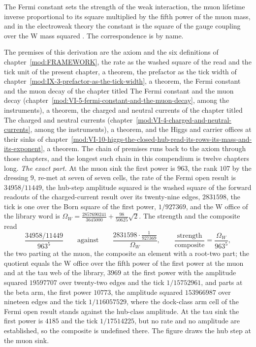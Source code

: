 \begin{chbridge}
The Fermi constant sets the strength of the weak interaction, the muon lifetime inverse proportional to its square multiplied by the fifth power of the muon mass, and in the electroweak theory the constant is the square of the gauge coupling over the W mass squared \cite{Fermi1934,Weinberg1967}. The correspondence is by name.
\end{chbridge}
\begin{chproof}
The premises of this derivation are the axiom and the six definitions of chapter~\ref{mod:FRAMEWORK}, the rate as the washed square of the read and the tick unit of the present chapter, a theorem, the prefactor as the tick width of chapter~\ref{mod:IX-3-prefactor-as-the-tick-width}, a theorem, the Fermi constant and the muon decay of the chapter titled The Fermi constant and the muon decay (chapter~\ref{mod:VI-5-fermi-constant-and-the-muon-decay}, among the instruments), a theorem, the charged and neutral currents of the chapter titled The charged and neutral currents (chapter~\ref{mod:VI-4-charged-and-neutral-currents}, among the instruments), a theorem, and the Higgs and carrier offices at their sinks of chapter~\ref{mod:VI-10-higgs-the-closed-hub-read-its-rows-its-mass-and-its-exponent}, a theorem. The chain of premises runs back to the axiom through those chapters, and the longest such chain in this compendium is twelve chapters long.
\textit{The exact part.} At the muon sink the first power is $963$, the rank $107$ by the dressing $9$, re-met at seven of seven cells, the rate of the Fermi open result is $34958/11449$, the hub-step amplitude squared is the washed square of the forward readouts of the charged-current result over its twenty-nine edges, $2831598$, the tick is one over the Born square of the first power, $1/927369$, and the W office of the library word is $\Omega_{W} = \tfrac{2857690241}{3645000} + \tfrac{98}{50625}\sqrt{2}$. The strength and the composite read
\begin{equation} \frac{34958/11449}{963^{5}} \qquad\text{against}\qquad \frac{2831598\cdot\tfrac{1}{927369}}{\Omega_{W}}, \qquad \frac{\text{strength}}{\text{composite}} = \frac{\Omega_{W}}{963^{5}}, \end{equation}
the two parting at the muon, the composite an element with a root-two part; the quotient equals the W office over the fifth power of the first power at the muon and at the tau web of the library, $3969$ at the first power with the amplitude squared $19597707$ over twenty-two edges and the tick $1/15752961$, and parts at the beta arm, the first power $10773$, the amplitude squared $153966987$ over nineteen edges and the tick $1/116057529$, where the dock-class arm cell of the Fermi open result stands against the hub-class amplitude. At the tau sink the first power is $4185$ and the tick $1/17514225$, but no rate and no amplitude are established, so the composite is undefined there. The figure draws the hub step at the muon sink.

\end{chproof}
